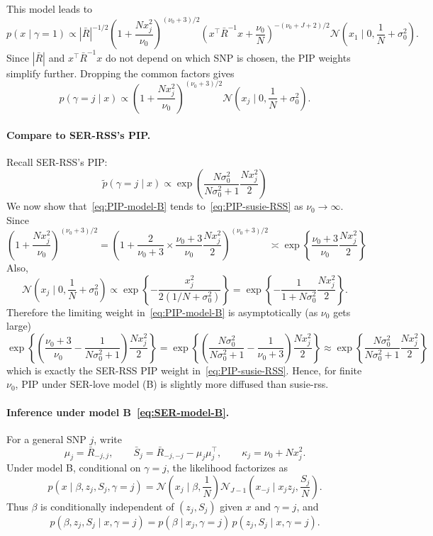 \documentclass[11pt]{article}
\newcommand{\Normal}{\mathcal N}
\begin{document}
This model leads to
\[
\boxed{
p(x\mid\gamma=1)
\propto
|\bar R|^{-1/2}
\left(1+\frac{Nx_j^2}{\nu_0}\right)^{(\nu_0+3)/2}
\left(x^\top\bar R^{-1}x+\frac{\nu_0}{N}\right)^{-(\nu_0+J+2)/2}
\Normal\left(x_1\mid 0,\frac{1}{N} + \sigma_0^2\right)
}.
\]
Since $|\bar R|$ and $x^\top\bar R^{-1}x$ do not depend on which SNP is chosen,
the PIP weights simplify further. Dropping the common factors gives
\begin{equation}\label{eq:PIP-model-B}
\boxed{
p(\gamma=j \mid x)
\propto
\left(1+\frac{Nx_j^2}{\nu_0}\right)^{(\nu_0+3)/2}
\Normal\left(x_j \mid 0,\frac{1}{N} + \sigma_0^2\right)
}.
\end{equation}

\paragraph{Compare to SER-RSS's PIP.} Recall SER-RSS's PIP:
\begin{equation}\label{eq:PIP-susie-RSS}
\tilde{p}(\gamma=j\mid x)
\propto \exp\left(\dfrac{N\sigma_0^{2}}{N\sigma_0^{2} + 1} \dfrac{N x_j^2}{2} \right)
\end{equation}
We now show that~\eqref{eq:PIP-model-B} tends to~\eqref{eq:PIP-susie-RSS}
as $\nu_0\to\infty$. Since
\[
\left(1+\frac{Nx_j^2}{\nu_0}\right)^{(\nu_0+3)/2} = \left(1+ \dfrac{2}{\nu_0 + 3} \times \dfrac{\nu_0 + 3}{\nu_0} \frac{Nx_j^2}{2}\right)^{(\nu_0+3)/2} 
\asymp \exp\left\{\frac{\nu_0 + 3}{\nu_0} \dfrac{Nx_j^2}{2}\right\}
\]
Also,
\[
\Normal\left(x_j\mid 0,\frac{1}{N}+\sigma_0^2\right)
\propto
\exp\left\{
-\frac{x_j^2}{2(1/N+\sigma_0^2)}
\right\}
=
\exp\left\{
-\frac{1}{1+N\sigma_0^2} \frac{N x_j^2}{2}
\right\}.
\]
Therefore the limiting weight in~\eqref{eq:PIP-model-B} is asymptotically (as $\nu_0$ gets large)
\[
\exp\left\{\left(\frac{\nu_0 + 3}{\nu_0} - \dfrac{1}{N\sigma_0^2 + 1}\right) \dfrac{Nx_j^2}{2}\right\} = \exp\left\{\left(\dfrac{N\sigma_0^2}{N\sigma_0^2 + 1} - \dfrac{1}{\nu_0 + 3}\right) \dfrac{Nx_j^2}{2}\right\} \approx \exp\left\{\dfrac{N\sigma_0^2}{N\sigma_0^2 + 1} \dfrac{Nx_j^2}{2}\right\}
\]
which is exactly the SER-RSS PIP weight in~\eqref{eq:PIP-susie-RSS}. Hence, for finite $\nu_0$, PIP under SER-love model (B) is slightly more diffused than susie-rss. 

\paragraph{Inference under model B~\eqref{eq:SER-model-B}.}
For a general SNP $j$, write
\[
\mu_j=\bar R_{-j,j},
\qquad
\bar S_j=\bar R_{-j,-j}-\mu_j\mu_j^\top,
\qquad
\kappa_j=\nu_0+Nx_j^2.
\]
Under model B, conditional on $\gamma=j$, the likelihood factorizes as
\[
p(x\mid \beta,z_j,S_j,\gamma=j)
=
\Normal\left(x_j\mid \beta,\frac{1}{N}\right)
\Normal_{J-1}\left(x_{-j}\mid x_jz_j,\frac{S_j}{N}\right).
\]
Thus $\beta$ is conditionally independent of $(z_j,S_j)$ given $x$ and
$\gamma=j$, and
\[
p(\beta,z_j,S_j\mid x,\gamma=j)
=
p(\beta\mid x_j,\gamma=j)\,
p(z_j,S_j\mid x,\gamma=j).
\]
\end{document}
